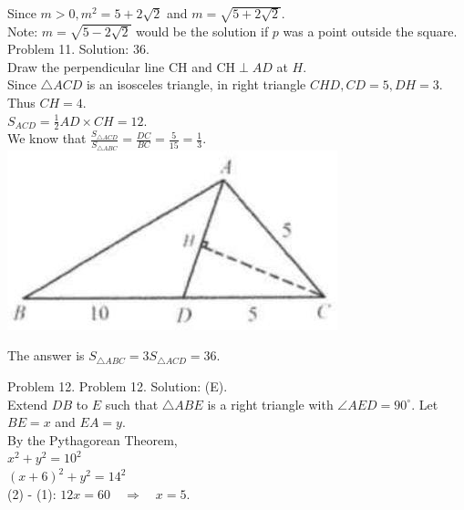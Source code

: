 \documentclass[10pt]{article}
\begin{document}
Since \(m>0, m^{2}=5+2 \sqrt{2}\) and \(m=\sqrt{5+2 \sqrt{2}}\).\\
Note: \(m=\sqrt{5-2 \sqrt{2}}\) would be the solution if \(p\) was a point outside the square.\\
Problem 11. Solution: 36.\\
Draw the perpendicular line CH and \(\mathrm{CH} \perp A D\) at \(H\).\\
Since \(\triangle A C D\) is an isosceles triangle, in right triangle \(C H D, C D=5, D H=3\). Thus \(C H=4\).\\
\(S_{A C D}=\frac{1}{2} A D \times C H=12\).\\
We know that \(\frac{S_{\triangle A C D}}{S_{\triangle A B C}}=\frac{D C}{B C}=\frac{5}{15}=\frac{1}{3}\).\\
\includegraphics[max width=\textwidth, center]{2025_04_17_97bc1f7e44d93c271a88g-096(2)}

The answer is \(S_{\triangle A B C}=3 S_{\triangle A C D}=36\).

Problem 12. Problem 12. Solution: (E).\\
Extend \(D B\) to \(E\) such that \(\triangle A B E\) is a right triangle with \(\angle A E D=90^{\circ}\). Let \(B E=x\) and \(E A=y\).\\
By the Pythagorean Theorem,\\
\(x^{2}+y^{2}=10^{2}\)\\
\((x+6)^{2}+y^{2}=14^{2}\)\\
(2) - (1): \(12 x=60 \quad \Rightarrow \quad x=5\).
\end{document}
